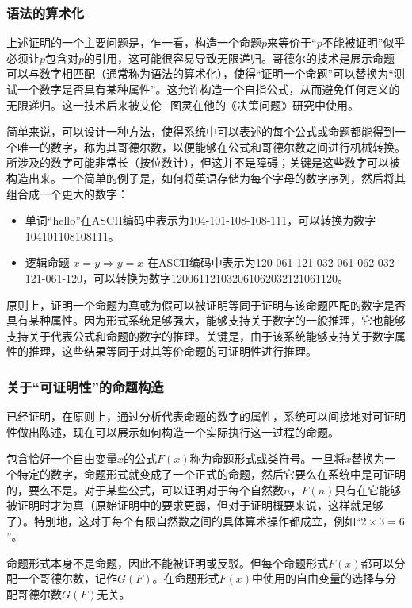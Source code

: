 \subsubsection{语法的算术化}  
上述证明的一个主要问题是，乍一看，构造一个命题\( p \)来等价于“\( p \)不能被证明”似乎必须让\( p \)包含对\( p \)的引用，这可能很容易导致无限递归。哥德尔的技术是展示命题可以与数字相匹配（通常称为语法的算术化），使得“证明一个命题”可以替换为“测试一个数字是否具有某种属性”。这允许构造一个自指公式，从而避免任何定义的无限递归。这一技术后来被艾伦·图灵在他的《决策问题》研究中使用。

简单来说，可以设计一种方法，使得系统中可以表述的每个公式或命题都能得到一个唯一的数字，称为其哥德尔数，以便能够在公式和哥德尔数之间进行机械转换。所涉及的数字可能非常长（按位数计），但这并不是障碍；关键是这些数字可以被构造出来。一个简单的例子是，如何将英语存储为每个字母的数字序列，然后将其组合成一个更大的数字：
\begin{itemize}
\item 单词“hello”在ASCII编码中表示为104-101-108-108-111，可以转换为数字104101108108111。
\item 逻辑命题 \( x = y \Rightarrow y = x \) 在ASCII编码中表示为120-061-121-032-061-062-032-121-061-120，可以转换为数字120061121032061062032121061120。
\end{itemize}
原则上，证明一个命题为真或为假可以被证明等同于证明与该命题匹配的数字是否具有某种属性。因为形式系统足够强大，能够支持关于数字的一般推理，它也能够支持关于代表公式和命题的数字的推理。关键是，由于该系统能够支持关于数字属性的推理，这些结果等同于对其等价命题的可证明性进行推理。
\subsubsection{关于“可证明性”的命题构造}
已经证明，在原则上，通过分析代表命题的数字的属性，系统可以间接地对可证明性做出陈述，现在可以展示如何构造一个实际执行这一过程的命题。

包含恰好一个自由变量\( x \)的公式\( F(x) \)称为命题形式或类符号。一旦将\( x \)替换为一个特定的数字，命题形式就变成了一个正式的命题，然后它要么在系统中是可证明的，要么不是。对于某些公式，可以证明对于每个自然数\( n \)，\( F(n) \)只有在它能够被证明时才为真（原始证明中的要求更弱，但对于证明概要来说，这样就足够了）。特别地，这对于每个有限自然数之间的具体算术操作都成立，例如“\( 2 \times 3 = 6 \)”。

命题形式本身不是命题，因此不能被证明或反驳。但每个命题形式\( F(x) \)都可以分配一个哥德尔数，记作\( G(F) \)。在命题形式\( F(x) \)中使用的自由变量的选择与分配哥德尔数\( G(F) \)无关。

